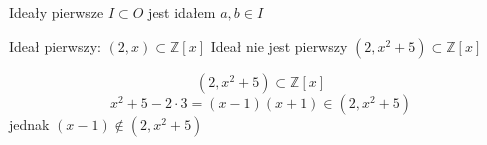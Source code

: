 \begin{frame}{Ideały pierwsze}
$I \subset O$ jest idałem 
$a, b \in I$

Ideał pierwszy: $(2,x) \subset \mathbb {Z}[x]$
Ideał nie jest pierwszy  $(2,x^{2}+5)\subset \mathbb {Z}[x]$
\begin{przyklad}
$$
    {\displaystyle (2,x^{2}+5)\subset \mathbb {Z}[x]}
$$
$$ 
    {\displaystyle x^{2}+5-2\cdot 3=(x-1)(x+1)\in (2,x^{2}+5)}
$$ jednak $(x-1) \notin (2,x^{2} + 5) $
\end{przyklad}

\end{frame}



